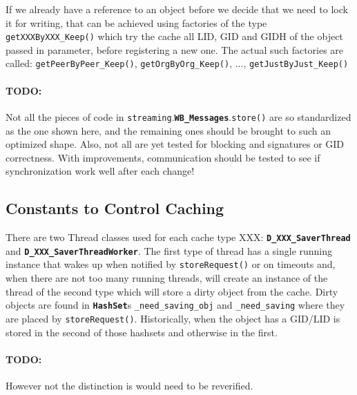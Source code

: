 \documentclass{book}
\newcommand{\pkg}[1]{{\tt #1}}
\newcommand{\cls}[1]{{\tt\bf #1}}
\newcommand{\mth}[1]{{\tt #1}}
\newcommand{\mmb}[1]{{\tt #1}}
\begin{document}
If we already have a reference to an object before we decide that we need to lock it for writing, that can be achieved using
factories of the type \mth{getXXXByXXX\_Keep()} which try the cache all LID, GID and GIDH of the object passed in parameter,
before registering a new one. The actual such factories are called: \mth{getPeerByPeer\_Keep()}, \mth{getOrgByOrg\_Keep()}, ..., \mth{getJustByJust\_Keep()}

\paragraph{TODO:} Not all the pieces of code in \pkg{streaming}.\cls{WB\_Messages}.\mth{store()} are
so standardized as the one shown here, and the remaining ones should be brought
to such an optimized shape. Also, not all are yet tested for blocking and signatures or GID correctness.
With improvements, communication should be tested to see if synchronization work well after each change!

\subsection{Constants to Control Caching}

There are two Thread classes used for each cache type XXX: \cls{D\_XXX\_SaverThread} and 
\cls{D\_XXX\_SaverThreadWorker}. The first type of thread has a single running instance that wakes up
when notified by \mth{storeRequest()} or on timeouts and, when there are not too many running threads,
will create an instance of the thread of the second type which will store a dirty object from the cache.
Dirty objects are found in \cls{HashSet}s \mmb{\_need\_saving\_obj} and \mmb{\_need\_saving}
where they are placed by \mth{storeRequest()}. Historically, when the object has a GID/LID  is stored in the second of those hashsets
and otherwise in the first. 
\paragraph{TODO:} However not the distinction is would need to be reverified.
\end{document}
